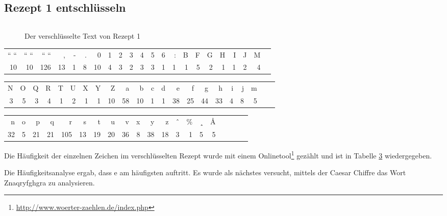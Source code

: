 \subsection{Rezept 1 entschlüsseln}
\label{RezeptEinsEntschluesseln}

\begin{figure}
\begin{lstlisting}

\end{lstlisting}
\caption{Der verschlüsselte Text von Rezept 1}
\end{figure}

\begin{table}[h]\footnotesize
\begin{tabular}{*{22}{r}}
  `` ``  &  `` ``  &  `` ``  &  ,  &  -  &  .  &  0  &  1  &  2  &  3  &  4  &  5  &  6  &  :  &  B  &  F  &  G  &  H & I & J  &  M \\
  10  &   10  &  126  &   13  &  1  &  8  &   10  &  4  &  3  &  2  &  3  &  3  &  1  &  1  &  1  &  5  &  2  &  1 & 1 & 2 & 4 \\
\end{tabular}

\begin{tabular}{*{22}{r}}
N  &  O  &  Q  &  R  &  T  &  U  &  X  &  Y  &  Z  &  a  &  b  &  c  &  d  &  e  &  f  &  g  &  h  &  i  &  j & m \\
3  &      5  &      3  &      4  &      1  &      2  &      1  &      1  &     10  &     58  &     10  &      1  &      1  &     38  &     25  &     44  &     33  &      4  &      8  &      5 \\
\end{tabular}

\begin{tabular}{*{20}{r}}
n  &  o  &  p  &  q  &  r  &  s  &  t  &  u  &  v  &  x  &  y  &  z  &  ˆ  &  \%  &  ¸  &  Å  \\
32  &      5  &     21  &     21  &    105  &     13  &     19  &     20  &     36  &      8  &     38  &     18  &      3  &      1  &      5  &      5  \\
\end{tabular}
\label{tab:rezept1haeufigkeit}
\end{table}

Die Häufigkeit der einzelnen Zeichen im verschlüsselten Rezept wurde mit einem
Onlinetool\footnote{\url{http://www.woerter-zaehlen.de/index.php}} gezählt und
ist in Tabelle \ref{tab:rezept1haeufigkeit} wiedergegeben.

Die Häufigkeitsanalyse ergab, dass \glqq{}e\grqq{} am häufigsten auftritt.
Es wurde als nächstes versucht, mittels der Caesar Chiffre das Wort
\glqq{}Znaqryfghgra\grqq{} zu analysieren.

